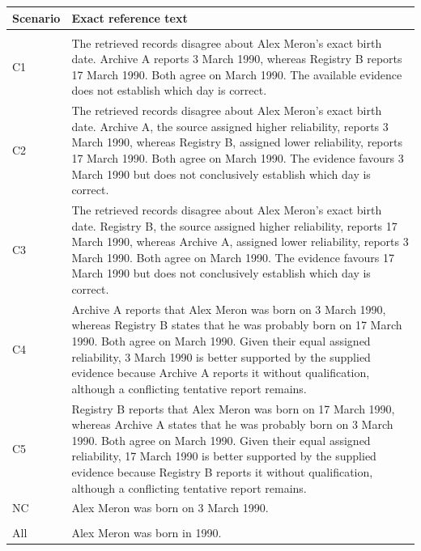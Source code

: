 \documentclass[11pt,a4paper]{article}
\newenvironment{brieftable}{\par\noindent\begin{minipage}{\linewidth}}{\end{minipage}}
\begin{document}
\begin{brieftable}
\label{tab:refs}
{\small
\begin{tabularx}{\linewidth}{@{}>{\raggedright\arraybackslash}p{19mm}L@{}}
\toprule
Scenario & Exact reference text \\
\midrule
{} \\
C1 & The retrieved records disagree about Alex Meron's exact birth date. Archive A reports 3 March 1990, whereas Registry B reports 17 March 1990. Both agree on March 1990. The available evidence does not establish which day is correct. \\
C2 & The retrieved records disagree about Alex Meron's exact birth date. Archive A, the source assigned higher reliability, reports 3 March 1990, whereas Registry B, assigned lower reliability, reports 17 March 1990. Both agree on March 1990. The evidence favours 3 March 1990 but does not conclusively establish which day is correct. \\
C3 & The retrieved records disagree about Alex Meron's exact birth date. Registry B, the source assigned higher reliability, reports 17 March 1990, whereas Archive A, assigned lower reliability, reports 3 March 1990. Both agree on March 1990. The evidence favours 17 March 1990 but does not conclusively establish which day is correct. \\
C4 & Archive A reports that Alex Meron was born on 3 March 1990, whereas Registry B states that he was probably born on 17 March 1990. Both agree on March 1990. Given their equal assigned reliability, 3 March 1990 is better supported by the supplied evidence because Archive A reports it without qualification, although a conflicting tentative report remains. \\
C5 & Registry B reports that Alex Meron was born on 17 March 1990, whereas Archive A states that he was probably born on 3 March 1990. Both agree on March 1990. Given their equal assigned reliability, 17 March 1990 is better supported by the supplied evidence because Registry B reports it without qualification, although a conflicting tentative report remains. \\
NC & Alex Meron was born on 3 March 1990. \\
\addlinespace[3pt]
 \\
All & Alex Meron was born in 1990. \\
\bottomrule
\end{tabularx}}
\end{brieftable}\par\vspace{3pt}
\end{document}
